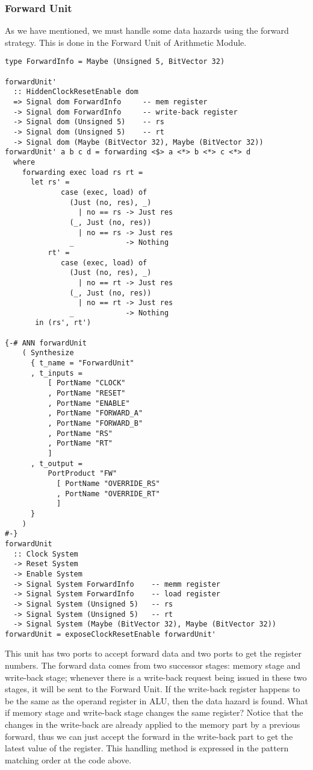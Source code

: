 \subsubsection{Forward Unit}
As we have mentioned, we must handle some data hazards using the forward strategy. This is done in the Forward Unit of Arithmetic Module.
\begin{verbatim}
type ForwardInfo = Maybe (Unsigned 5, BitVector 32)

forwardUnit' 
  :: HiddenClockResetEnable dom
  => Signal dom ForwardInfo     -- mem register
  -> Signal dom ForwardInfo     -- write-back register
  -> Signal dom (Unsigned 5)    -- rs
  -> Signal dom (Unsigned 5)    -- rt
  -> Signal dom (Maybe (BitVector 32), Maybe (BitVector 32))
forwardUnit' a b c d = forwarding <$> a <*> b <*> c <*> d
  where
    forwarding exec load rs rt =
      let rs' =
             case (exec, load) of
               (Just (no, res), _)
                 | no == rs -> Just res
               (_, Just (no, res))
                 | no == rs -> Just res
               _            -> Nothing
          rt' =
             case (exec, load) of
               (Just (no, res), _)
                 | no == rt -> Just res
               (_, Just (no, res))
                 | no == rt -> Just res
               _            -> Nothing
       in (rs', rt')

{-# ANN forwardUnit
    ( Synthesize
      { t_name = "ForwardUnit"
      , t_inputs =
          [ PortName "CLOCK"
          , PortName "RESET"
          , PortName "ENABLE"
          , PortName "FORWARD_A"
          , PortName "FORWARD_B"
          , PortName "RS"
          , PortName "RT" 
          ]
      , t_output =
          PortProduct "FW" 
            [ PortName "OVERRIDE_RS"
            , PortName "OVERRIDE_RT"
            ]
      }
    )
#-}
forwardUnit 
  :: Clock System
  -> Reset System
  -> Enable System
  -> Signal System ForwardInfo    -- memm register
  -> Signal System ForwardInfo    -- load register
  -> Signal System (Unsigned 5)   -- rs
  -> Signal System (Unsigned 5)   -- rt
  -> Signal System (Maybe (BitVector 32), Maybe (BitVector 32))
forwardUnit = exposeClockResetEnable forwardUnit'
\end{verbatim}
This unit has two ports to accept forward data and two ports to get the register numbers. The forward data comes from two successor stages: memory stage and write-back stage; whenever there is a write-back request being issued in these two stages, it will be sent to the Forward Unit. If the write-back register happens to be the same as the operand register in ALU, then the data hazard is found. What if memory stage and write-back stage changes the same register? Notice that the changes in the write-back are already applied to the memory part by a previous forward, thus we can just accept the forward in the write-back part to get the latest value of the register. This handling method is expressed in the pattern matching order at the code above.

